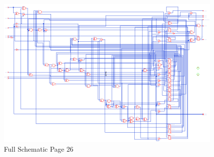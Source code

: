 \documentclass[11pt]{article}
\begin{document}
	
	\begin{figure}[H] 
		\centering 
		\includegraphics[width=0.7\linewidth]{"Pictures/Full Schematic Page 26"}
		\caption{Full Schematic Page 26} 
		\label{fig:Full-Schematic-Page-26} 
	\end{figure}
	
\end{document}
